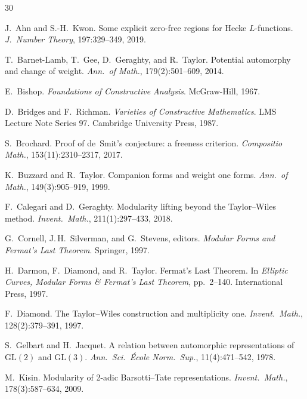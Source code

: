 \documentclass[11pt]{article}
\theoremstyle{plain}
\theoremstyle{definition}
\theoremstyle{remark}
\begin{document}
\begin{thebibliography}{30}

J.~Ahn and S.-H.~Kwon.
\newblock Some explicit zero-free regions for Hecke $L$-functions.
\newblock \textit{J.~Number Theory}, 197:329--349, 2019.

T.~Barnet-Lamb, T.~Gee, D.~Geraghty, and R.~Taylor.
\newblock Potential automorphy and change of weight.
\newblock \textit{Ann.\ of Math.}, 179(2):501--609, 2014.

E.~Bishop.
\newblock \textit{Foundations of Constructive Analysis}.
\newblock McGraw-Hill, 1967.

D.~Bridges and F.~Richman.
\newblock \textit{Varieties of Constructive Mathematics}.
\newblock LMS Lecture Note Series 97. Cambridge University Press, 1987.

S.~Brochard.
\newblock Proof of de~Smit's conjecture: a freeness criterion.
\newblock \textit{Compositio Math.}, 153(11):2310--2317, 2017.

K.~Buzzard and R.~Taylor.
\newblock Companion forms and weight one forms.
\newblock \textit{Ann.\ of Math.}, 149(3):905--919, 1999.

F.~Calegari and D.~Geraghty.
\newblock Modularity lifting beyond the Taylor--Wiles method.
\newblock \textit{Invent.\ Math.}, 211(1):297--433, 2018.

G.~Cornell, J.\,H.~Silverman, and G.~Stevens, editors.
\newblock \textit{Modular Forms and Fermat's Last Theorem}.
\newblock Springer, 1997.

H.~Darmon, F.~Diamond, and R.~Taylor.
\newblock Fermat's Last Theorem.
\newblock In \textit{Elliptic Curves, Modular Forms \& Fermat's Last
Theorem}, pp.~2--140.  International Press, 1997.

F.~Diamond.
\newblock The Taylor--Wiles construction and multiplicity one.
\newblock \textit{Invent.\ Math.}, 128(2):379--391, 1997.

S.~Gelbart and H.~Jacquet.
\newblock A relation between automorphic representations of $\mathrm{GL}(2)$
and $\mathrm{GL}(3)$.
\newblock \textit{Ann.\ Sci.\ \'Ecole Norm.\ Sup.}, 11(4):471--542, 1978.

M.~Kisin.
\newblock Modularity of 2-adic Barsotti--Tate representations.
\newblock \textit{Invent.\ Math.}, 178(3):587--634, 2009.


\end{thebibliography}
\end{document}
